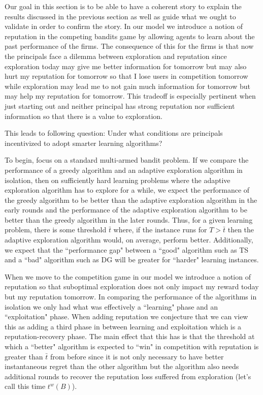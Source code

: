 \documentclass[11pt,letterpaper]{article}
\begin{document}
Our goal in this section is to be able to have a coherent story to explain the results discussed in the previous section as well as guide what we ought to validate in order to confirm the story. In our model we introduce a notion of reputation in the competing bandits game by allowing agents to learn about the past performance of the firms. The consequence of this for the firms is that now the principals face a dilemma between exploration and reputation since exploration today may give me better information for tomorrow but may also hurt my reputation for tomorrow so that I lose users in competition tomorrow while exploration may lead me to not gain much information for tomorrow but may help my reputation for tomorrow. This tradeoff is especially pertinent when just starting out and neither principal has strong reputation nor sufficient information so that there is a value to exploration.

This leads to following question: Under what conditions are principals incentivized to adopt smarter learning algorithms?

To begin, focus on a standard multi-armed bandit problem. If we compare the performance of a greedy algorithm and an adaptive exploration algorithm in isolation, then on sufficiently hard learning problems where the adaptive exploration algorithm has to explore for a while, we expect the performance of the greedy algorithm to be better than the adaptive exploration algorithm in the early rounds and the performance of the adaptive exploration algorithm to be better than the greedy algorithm in the later rounds. Thus, for a given learning problem, there is some threshold $\bar{t}$ where, if the instance runs for $T > \bar{t}$ then the adaptive exploration algorithm would, on average, perform better. Additionally, we expect that the ``performance gap" between a ``good" algorithm such as TS and a ``bad" algorithm such as DG will be greater for ``harder" learning instances.

When we move to the competition game in our model we introduce a notion of reputation so that suboptimal exploration does not only impact my reward today but my reputation tomorrow. In comparing the performance of the algorithms in isolation we only had what was effectively a ``learning" phase and an ``exploitation" phase. When adding reputation we conjecture that we can view this as adding a third phase in between learning and exploitation which is a reputation-recovery phase. The main effect that this has is that the threshold at which a ``better" algorithm is expected to ``win" in competition with reputation is greater than $\bar{t}$ from before since it is not only necessary to have better instantaneous regret than the other algorithm but the algorithm also needs additional rounds to recover the reputation loss suffered from exploration (let's call this time $t^{w}(B)$).
\end{document}
